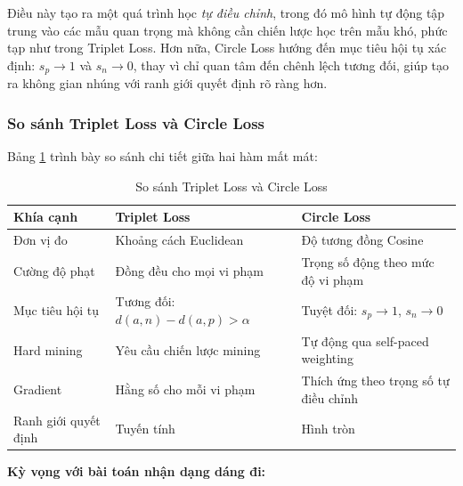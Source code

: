 Điều này tạo ra một quá trình học \textit{tự điều chỉnh}, trong đó mô hình tự động tập trung vào các mẫu quan trọng mà không cần chiến lược học trên mẫu khó, phức tạp như trong Triplet Loss. Hơn nữa, Circle Loss hướng đến mục tiêu hội tụ xác định: $s_p \rightarrow 1$ và $s_n \rightarrow 0$, thay vì chỉ quan tâm đến chênh lệch tương đối, giúp tạo ra không gian nhúng với ranh giới quyết định rõ ràng hơn.

\subsubsection{So sánh Triplet Loss và Circle Loss}

Bảng \ref{tab:triplet_vs_circle} trình bày so sánh chi tiết giữa hai hàm mất mát:

\begin{table}[h]
  \centering
  \caption{So sánh Triplet Loss và Circle Loss}
  \label{tab:triplet_vs_circle}
  \begin{tabular}{|l|p{5.5cm}|p{5.5cm}|}
    \hline
    \textbf{Khía cạnh}   & \textbf{Triplet Loss}                 & \textbf{Circle Loss}                                \\
    \hline
    Đơn vị đo            & Khoảng cách Euclidean                 & Độ tương đồng Cosine                                \\
    \hline
    Cường độ phạt        & Đồng đều cho mọi vi phạm              & Trọng số động theo mức độ vi phạm                   \\
    \hline
    Mục tiêu hội tụ      & Tương đối: $d(a,n) - d(a,p) > \alpha$ & Tuyệt đối: $s_p \rightarrow 1$, $s_n \rightarrow 0$ \\
    \hline
    Hard mining          & Yêu cầu chiến lược mining             & Tự động qua self-paced weighting                    \\
    \hline
    Gradient             & Hằng số cho mỗi vi phạm               & Thích ứng theo trọng số tự điều chỉnh                \\
    \hline
    Ranh giới quyết định & Tuyến tính                            & Hình tròn                                \\
    \hline
  \end{tabular}
\end{table}

\textbf{Kỳ vọng với bài toán nhận dạng dáng đi:}

